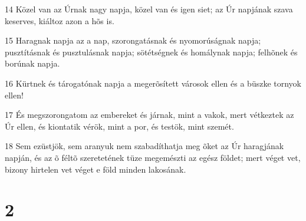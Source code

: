 \par 14 Közel van az Úrnak nagy napja, közel van és igen siet; az Úr napjának szava keserves, kiáltoz azon a hõs is.
\par 15 Haragnak napja az a nap, szorongatásnak és nyomorúságnak napja; pusztításnak és pusztulásnak napja; sötétségnek és homálynak napja; felhõnek és borúnak napja.
\par 16 Kürtnek és tárogatónak napja a megerõsített városok ellen és a büszke tornyok ellen!
\par 17 És megszorongatom az embereket és járnak, mint a vakok, mert vétkeztek az Úr ellen, és kiontatik vérök, mint a por, és testök, mint szemét.
\par 18 Sem ezüstjök, sem aranyuk nem szabadíthatja meg õket az Úr haragjának napján, és az õ féltõ szeretetének tüze megemészti az egész földet; mert véget vet, bizony hirtelen vet véget e föld minden lakosának.

\chapter{2}

